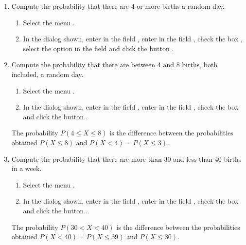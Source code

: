 \begin{enumerate}[leftmargin=*]
\begin{enumerate}
\item Compute the probability that there are 4 or more births a random day. 
\begin{indication}
\begin{enumerate}
\item Select the menu .
\item In the dialog shown, enter  in the field , enter  in the field
, check the box , select the option  in the field
 and click the button .
\end{enumerate}
\end{indication}

\item Compute the probability that there are between 4 and 8 births, both included, a random day. 
\begin{indication}
\begin{enumerate}
\item Select the menu .
\item In the dialog shown, enter  in the field , enter  in the field , check the box  and click the button .
\end{enumerate}
The probability $P(4\leq X\leq 8)$ is the difference between the probabilities obtained $P(X\leq 8)$ and $P(X<4)=P(X\leq 3)$.
\end{indication}

\item Compute the probability that there are more than 30 and less than 40 births in a week. 
\begin{indication}
\begin{enumerate}
\item Select the menu .
\item In the dialog shown, enter  in the field , enter  in the field , check the box  and click the button .
\end{enumerate}
The probability $P(30< X< 40)$ is the difference between the probabilities obtained $P(X<40)=P(X\leq 39)$ and $P(X\leq 30)$.
\end{indication}
\end{enumerate}



\end{enumerate}

